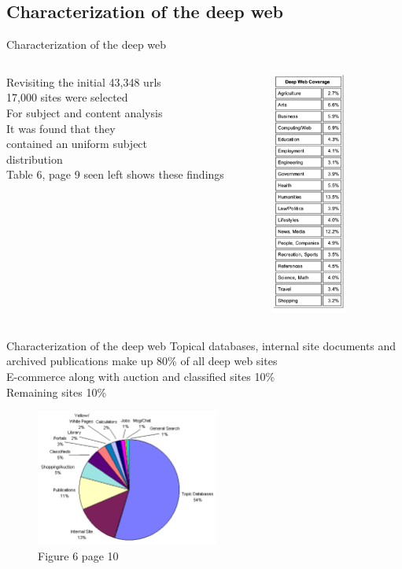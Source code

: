 \documentclass{beamer}
\begin{document}
\subsection{Characterization of the deep web}
\begin{frame}[fragile]{Characterization of the deep web}
\begin{columns}[T,onlytextwidth]
	Revisiting the initial 43,348 urls \\
	17,000 sites were selected \\ 
	For subject and content analysis \\
	It was found that they  \\
	contained an uniform subject \\
	distribution  \\
	Table 6, page 9 seen left shows these findings \\
  		\begin{figure}
			\includegraphics[height=8cm]{dwsubj.png}
		\end{figure}
  \end{columns}

\end{frame}
\begin{frame}[fragile]{Characterization of the deep web}
Topical databases, internal site documents and archived publications make up 80\% of all deep web sites\\
E-commerce along with auction and classified sites 10\% \\
Remaining sites 10\% 
\begin{figure}
			\includegraphics[width=6cm]{dwct.png}
			\caption{ Figure 6 page 10}
		\end{figure}
\end{frame}
\end{document}
